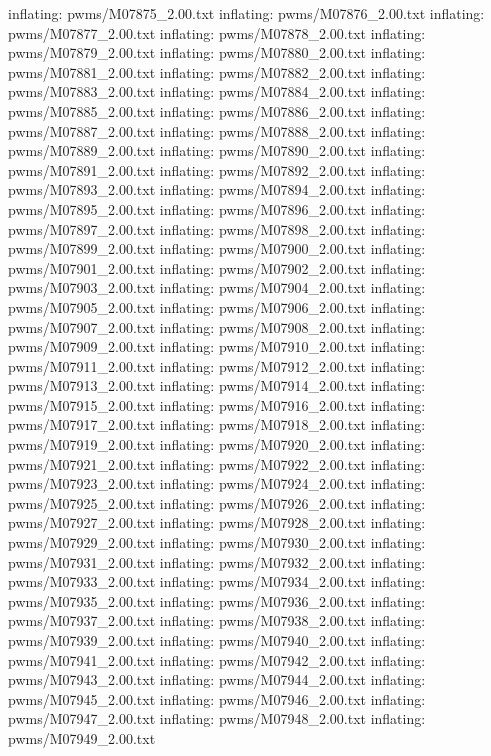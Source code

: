 \documentclass[letterpaper,10pt,english]{sphinxmanual}
\begin{document}
{\begin{sphinxVerbatim}[commandchars=\\\{\}]
  inflating: pwms/M07875\_2.00.txt
  inflating: pwms/M07876\_2.00.txt
  inflating: pwms/M07877\_2.00.txt
  inflating: pwms/M07878\_2.00.txt
  inflating: pwms/M07879\_2.00.txt
  inflating: pwms/M07880\_2.00.txt
  inflating: pwms/M07881\_2.00.txt
  inflating: pwms/M07882\_2.00.txt
  inflating: pwms/M07883\_2.00.txt
  inflating: pwms/M07884\_2.00.txt
  inflating: pwms/M07885\_2.00.txt
  inflating: pwms/M07886\_2.00.txt
  inflating: pwms/M07887\_2.00.txt
  inflating: pwms/M07888\_2.00.txt
  inflating: pwms/M07889\_2.00.txt
  inflating: pwms/M07890\_2.00.txt
  inflating: pwms/M07891\_2.00.txt
  inflating: pwms/M07892\_2.00.txt
  inflating: pwms/M07893\_2.00.txt
  inflating: pwms/M07894\_2.00.txt
  inflating: pwms/M07895\_2.00.txt
  inflating: pwms/M07896\_2.00.txt
  inflating: pwms/M07897\_2.00.txt
  inflating: pwms/M07898\_2.00.txt
  inflating: pwms/M07899\_2.00.txt
  inflating: pwms/M07900\_2.00.txt
  inflating: pwms/M07901\_2.00.txt
  inflating: pwms/M07902\_2.00.txt
  inflating: pwms/M07903\_2.00.txt
  inflating: pwms/M07904\_2.00.txt
  inflating: pwms/M07905\_2.00.txt
  inflating: pwms/M07906\_2.00.txt
  inflating: pwms/M07907\_2.00.txt
  inflating: pwms/M07908\_2.00.txt
  inflating: pwms/M07909\_2.00.txt
  inflating: pwms/M07910\_2.00.txt
  inflating: pwms/M07911\_2.00.txt
  inflating: pwms/M07912\_2.00.txt
  inflating: pwms/M07913\_2.00.txt
  inflating: pwms/M07914\_2.00.txt
  inflating: pwms/M07915\_2.00.txt
  inflating: pwms/M07916\_2.00.txt
  inflating: pwms/M07917\_2.00.txt
  inflating: pwms/M07918\_2.00.txt
  inflating: pwms/M07919\_2.00.txt
  inflating: pwms/M07920\_2.00.txt
  inflating: pwms/M07921\_2.00.txt
  inflating: pwms/M07922\_2.00.txt
  inflating: pwms/M07923\_2.00.txt
  inflating: pwms/M07924\_2.00.txt
  inflating: pwms/M07925\_2.00.txt
  inflating: pwms/M07926\_2.00.txt
  inflating: pwms/M07927\_2.00.txt
  inflating: pwms/M07928\_2.00.txt
  inflating: pwms/M07929\_2.00.txt
  inflating: pwms/M07930\_2.00.txt
  inflating: pwms/M07931\_2.00.txt
  inflating: pwms/M07932\_2.00.txt
  inflating: pwms/M07933\_2.00.txt
  inflating: pwms/M07934\_2.00.txt
  inflating: pwms/M07935\_2.00.txt
  inflating: pwms/M07936\_2.00.txt
  inflating: pwms/M07937\_2.00.txt
  inflating: pwms/M07938\_2.00.txt
  inflating: pwms/M07939\_2.00.txt
  inflating: pwms/M07940\_2.00.txt
  inflating: pwms/M07941\_2.00.txt
  inflating: pwms/M07942\_2.00.txt
  inflating: pwms/M07943\_2.00.txt
  inflating: pwms/M07944\_2.00.txt
  inflating: pwms/M07945\_2.00.txt
  inflating: pwms/M07946\_2.00.txt
  inflating: pwms/M07947\_2.00.txt
  inflating: pwms/M07948\_2.00.txt
  inflating: pwms/M07949\_2.00.txt

\end{sphinxVerbatim}}
\end{document}
